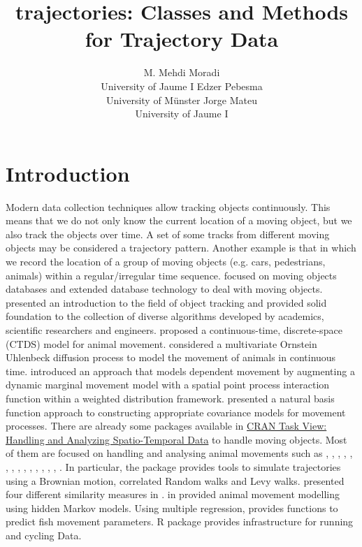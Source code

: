 \documentclass[article]{jss}
\author{M. Mehdi Moradi\\University of Jaume I
    \And Edzer Pebesma\\University of M\"unster
    \And Jorge Mateu\\University of Jaume I}
\title{trajectories: Classes and Methods for Trajectory Data}
\begin{document}
\section[Introduction]{Introduction}\label{sec:intro}
Modern data collection techniques allow tracking objects continuously. This means that we do not only know the current location of a moving object, but we also track the objects over time. A set of some tracks from different moving objects may be considered a trajectory pattern. Another example is that in which we record the location of a group of moving objects (e.g. cars, pedestrians, animals) within a regular/irregular time sequence. \cite{guting05} focused on moving objects databases and extended database technology to deal with moving objects. \cite{challa2011} presented an introduction to the field of object tracking and provided solid foundation to the collection of diverse algorithms developed by academics, scientific researchers and engineers. \cite{hanks15} proposed a continuous-time, discrete-space (CTDS) model for animal movement. \cite{niu2016modeling} considered a multivariate Ornstein Uhlenbeck diffusion process to model the movement of animals in continuous time. \cite{russell16} introduced an approach that models dependent movement by augmenting a dynamic marginal movement model with a spatial point process interaction function within a weighted distribution framework. \cite{hooten17} presented a natural basis function approach to constructing appropriate covariance models for movement processes. There are already some  packages available in \href{https://cran.r-project.org}{CRAN Task View: Handling and Analyzing Spatio-Temporal Data} to handle moving objects. Most of them are focused on handling and analysing animal movements such as  \citep{calenge06},  \citep{sumner2009},  \citep{argosf},  \citep{V-Track},  \citep{animalTrack},  \citep{BBMM},  \citep{bcpa},  \citep{BayesianAnimalTracker},  \citep{TrackReconstruction},  \citep{mkde},  \citep{SimilarityMeasures},  \citep{smam}, \citep{trip},  \citep{moveHMM},  \citep{FLightR}. In particular, the package  \citep{calenge06} provides tools to simulate trajectories using a Brownian motion, correlated Random walks and Levy walks. \cite{SimilarityMeasures} presented four different similarity measures in . \cite{moveHMM} in  provided animal movement modelling using hidden Markov models. Using multiple regression,  \citep{fishmove}  provides functions to predict fish movement parameters. R package  \citep{frick} provides infrastructure for running and cycling Data.
\end{document}
